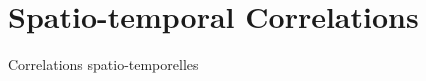 


















\newpage




\section{Spatio-temporal Correlations}{Correlations spatio-temporelles}



\label{sec:app:spatiotempcorrs}


